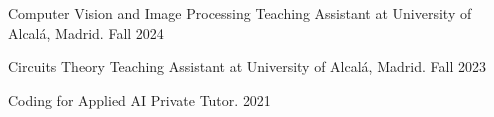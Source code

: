 


\begin{cvhonors}


    \cvhonor
    {Computer Vision and Image Processing} %
    {Teaching Assistant at University of Alcalá, Madrid.} %
    {} %
    {Fall 2024} %

    \cvhonor
    {Circuits Theory} %
    {Teaching Assistant at University of Alcalá, Madrid.} %
    {} %
    {Fall 2023} %

    \cvhonor
    {Coding for Applied AI} %
    {Private Tutor.} %
    {} %
    {2021} %

\end{cvhonors}
